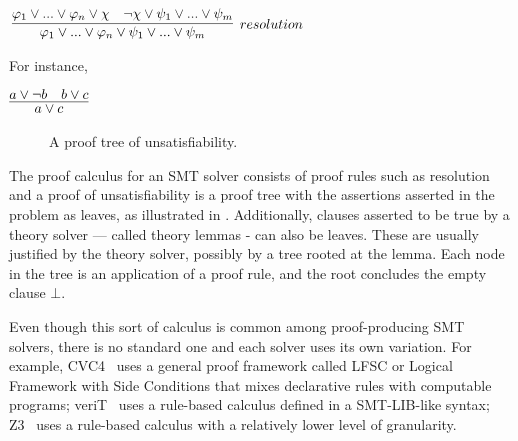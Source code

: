 \documentclass{article}
\begin{document}
	\begin{center}
		$\infer[resolution]{\varphi_1 \lor ... \lor \varphi_n \lor 
			\psi_1 \lor ... \lor \psi_m}
		{\varphi_1 \lor ... \lor \varphi_n \lor \chi & \neg \chi 
			\lor \psi_1 \lor ... \lor \psi_m}$ 
	\end{center}
	For instance,
	\begin{center}
		$\infer{a \lor c}{a \lor \neg b & b \lor c}$
	\end{center}
	
	\begin{figure}[t]
		\caption{A proof tree of unsatisfiability.}
		\label{fig:tree}
	\end{figure}

	The proof calculus for an SMT solver consists 
	of proof rules such as resolution and a 
	proof of unsatisfiability is a proof tree with 
	the assertions asserted in the problem as 
	leaves, as illustrated in .
	Additionally, clauses asserted to 
	be true by a theory solver --- called theory lemmas 
	- can also be leaves. These are usually 
	justified by the theory solver, possibly by 
	a tree rooted at the lemma. Each node in 
	the tree is an application of a proof rule, 
	and the root concludes the empty clause $\bot$.
	
	Even though this sort of calculus is common among 
	proof-producing SMT solvers, there is no standard 
	one and each solver uses its own variation.
	For example, CVC4~\cite{DBLP:conf/cav/BarrettCDHJKRT11} 
	uses a general proof framework called LFSC or 
	Logical Framework with Side Conditions
	that mixes declarative rules with computable programs; 
	veriT~\cite{10.1007/978-3-642-02959-2_12} uses a 
	rule-based calculus defined in a 
	SMT-LIB-like syntax; 
	Z3~\cite{10.1007/978-3-540-78800-3_24} uses a 
	rule-based calculus with a relatively lower level 
	of granularity.
	
\end{document}
